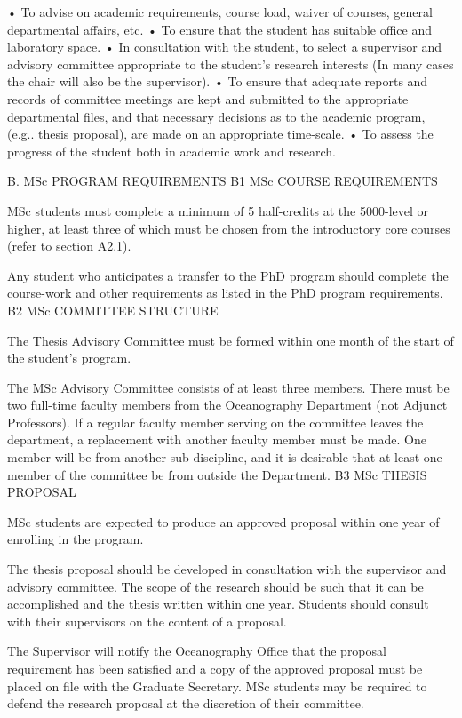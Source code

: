 \documentclass{article}
\begin{document}
•	To advise on academic requirements, course load, waiver of courses, general departmental affairs, etc.
•	To ensure that the student has suitable office and laboratory space.
•	In consultation with the student, to select a supervisor and advisory committee appropriate to the student's research interests (In many cases the chair will also be the supervisor).
•	To ensure that adequate reports and records of committee meetings are kept and submitted to the appropriate departmental files, and that necessary decisions as to the academic program, (e.g.. thesis proposal), are made on an appropriate time-scale.
•	To assess the progress of the student both in academic work and research.
 

B.	MSc  PROGRAM REQUIREMENTS
B1	MSc COURSE REQUIREMENTS

MSc students must complete a minimum of 5 half-credits at the 5000-level or higher, at least three of which must be chosen from the introductory core courses (refer to section A2.1).

Any student who anticipates a transfer to the PhD program should complete the course-work and other requirements as listed in the PhD program requirements.
B2	MSc COMMITTEE STRUCTURE

The Thesis Advisory Committee must be formed within one month of the start of the student’s program.

The MSc Advisory Committee consists of at least three members. There must be two full-time faculty members from the Oceanography Department (not Adjunct Professors). If a regular faculty member serving on the committee leaves the department, a replacement with another faculty member must be made. One member will be from another sub-discipline, and it is desirable that at least one member of the committee be from outside the Department.
B3	MSc THESIS PROPOSAL

MSc students are expected to produce an approved proposal within one year of enrolling in the program.

The thesis proposal should be developed in consultation with the supervisor and advisory committee. The scope of the research should be such that it can be accomplished and the thesis written within one year. Students should consult with their supervisors on the content of a proposal.

The Supervisor will notify the Oceanography Office that the proposal requirement has been satisfied and a copy of the approved proposal must be placed on file with the Graduate Secretary. MSc students may be required to defend the research proposal at the discretion of their committee.
\end{document}
